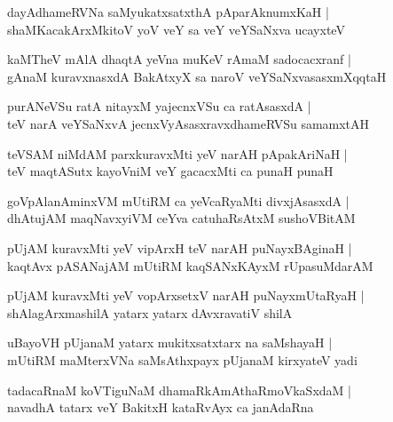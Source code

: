 \documentclass[twoside,12pt,openright]{book}
\newcounter{shloka}[chapter]
\begin{document}
\begin{shloka}%
dayAdhameRVNa saMyukatxsatxthA pAparAknumxKaH |\\
shaMKacakArxMkitoV yoV veY sa veY veYSaNxva ucayxteV 
\end{shloka}

\begin{shloka}%
kaMTheV mAlA dhaqtA yeVna muKeV rAmaM sadocacxranf |\\
gAnaM kuravxnasxdA BakAtxyX sa naroV veYSaNxvasasxmXqqtaH 
\end{shloka}

\begin{shloka}%
purANeVSu ratA nitayxM yajecnxVSu ca ratAsasxdA |\\
teV narA veYSaNxvA jecnxVyAsasxravxdhameRVSu samamxtAH
\end{shloka}

\begin{shloka}%
teVSAM niMdAM parxkuravxMti yeV narAH pApakAriNaH |\\
teV maqtASutx kayoVniM veY gacacxMti ca punaH punaH 
\end{shloka}

\begin{shloka}%
goVpAlanAminxVM mUtiRM ca yeVcaRyaMti divxjAsasxdA |\\
dhAtujAM maqNavxyiVM ceYva catuhaRsAtxM sushoVBitAM
\end{shloka}

\begin{shloka}%
pUjAM kuravxMti yeV vipArxH teV narAH puNayxBAginaH |\\
kaqtAvx pASANajAM mUtiRM kaqSANxKAyxM rUpasuMdarAM 
\end{shloka}

\begin{shloka}%
pUjAM kuravxMti yeV vopArxsetxV narAH puNayxmUtaRyaH |\\
shAlagArxmashilA yatarx yatarx dAvxravatiV shilA 
\end{shloka}

\begin{shloka}%
uBayoVH pUjanaM yatarx mukitxsatxtarx na saMshayaH |\\
mUtiRM maMterxVNa saMsAthxpayx pUjanaM kirxyateV yadi 
\end{shloka}

\begin{shloka}%
tadacaRnaM koVTiguNaM dhamaRkAmAthaRmoVkaSxdaM |\\
navadhA tatarx veY BakitxH kataRvAyx ca janAdaRna
\end{shloka}
\end{document}

